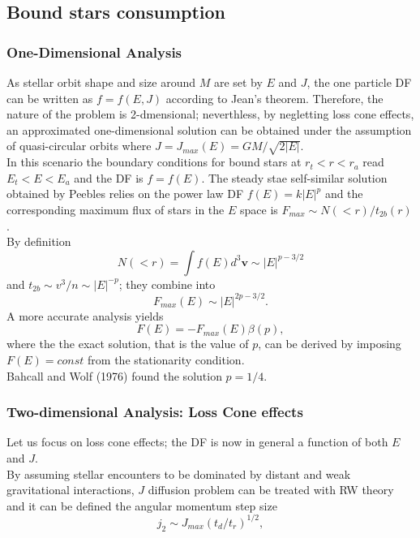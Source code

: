 \subsection{Bound stars consumption}
\subsubsection{One-Dimensional Analysis }
As stellar orbit shape and size around $M$ are set by $E$ and $J$, the one particle DF can be written as $f=f(E,J)$ according to Jean's theorem. Therefore, the nature of the problem is 2-dmensional; neverthless, by negletting loss cone effects, an approximated one-dimensional solution can be obtained under the assumption of quasi-circular orbits where $J=J_{max}(E)=GM/\sqrt{2|E|}$.\\In this scenario the boundary conditions for bound stars at $r_t<r<r_a$ read $E_t<E<E_a$ and the DF is $f=f(E)$. The steady stae self-similar solution obtained by Peebles relies on the power law DF $f(E)=k|E|^p$ and the corresponding maximum flux of stars in the $E$ space is $F_{max}\sim N(<r)/t_{2b}(r)$.\\By definition \begin{equation}
    N(<r)=\int f(E)d^3\mathbf{v}\sim |E|^{p-3/2}
\end{equation}
and $t_{2b}\sim v^3/n\sim |E|^{-p}$; they combine into
\begin{equation}
    F_{max}(E)\sim |E|^{2p-3/2}.
\end{equation}
A more accurate analysis yields
\begin{equation}
    F(E)=-F_{max}(E)\beta(p),
\end{equation}
where the the exact solution, that is the value of $p$, can be derived by imposing $F(E)=const$ from the stationarity condition.\\Bahcall and Wolf (1976) found the solution $p=1/4$.
\subsubsection{Two-dimensional Analysis: Loss Cone effects}

Let us focus on loss cone effects; the DF is now in general a function of both $E$ and $J$.\\By assuming stellar encounters to be dominated by distant and weak gravitational interactions, $J$ diffusion problem can be treated with RW theory and it can be defined the angular momentum step size
\begin{equation}\label{j_2 definition}
    j_2\sim J_{max}(t_d/t_r)^{1/2},
\end{equation}

